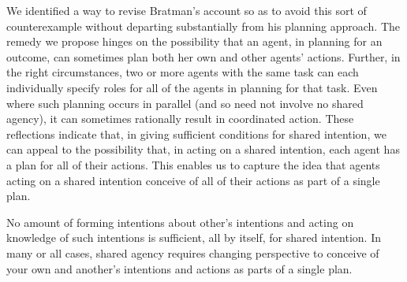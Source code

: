 \documentclass[12pt,\papersize]{extarticle}
\begin{document}
We identified a way to revise Bratman's account so as to avoid this sort of counterexample without departing substantially from his planning approach.
The remedy we propose hinges on the possibility that an agent, in planning for an outcome, can sometimes plan both her own and other agents' actions.
Further, in the right circumstances,
two or more agents with the same task
	can each individually specify roles for all of the agents in planning for that task.
Even where such planning occurs in parallel (and so need not involve no shared agency),  it can sometimes rationally result in coordinated action.
These reflections indicate that, in giving sufficient conditions for shared intention, we can appeal to the possibility that, in acting on a shared intention, each agent has a plan for all of their actions.
This enables us to capture the idea that agents acting on a shared intention conceive of all of their actions as part of a single plan.

No amount of forming intentions about other's intentions and acting on knowledge of such intentions is sufficient, all by itself, for shared intention.  
In many or all cases, shared agency requires changing perspective 
to conceive of your own and another's intentions and actions as parts of a single plan.



\end{document}
